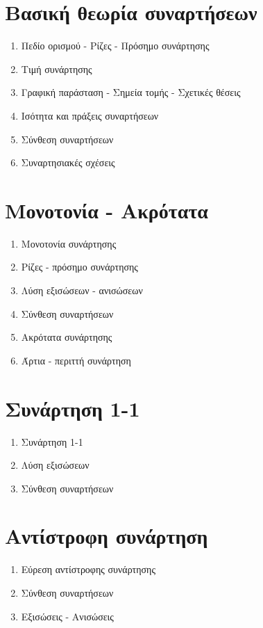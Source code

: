 \documentclass[twoside,nofonts,math,spyros,ektypwsh]{frontisthrio}
\begin{document}
\section{Βασική θεωρία συναρτήσεων}
\begin{multicols}{2}
\begin{enumerate}
\item Πεδίο ορισμού - Ρίζες - Πρόσημο συνάρτησης
\item Τιμή συνάρτησης
\item Γραφική παράσταση - Σημεία τομής - Σχετικές θέσεις
\item Ισότητα και πράξεις συναρτήσεων
\item Σύνθεση συναρτήσεων
\item Συναρτησιακές σχέσεις
\end{enumerate}
\end{multicols}
\section{Μονοτονία - Ακρότατα}
\begin{multicols}{2}
\begin{enumerate}
\item Μονοτονία συνάρτησης
\item Ρίζες - πρόσημο συνάρτησης
\item Λύση εξισώσεων - ανισώσεων
\item Σύνθεση συναρτήσεων
\item Ακρότατα συνάρτησης
\item Άρτια - περιττή συνάρτηση
\end{enumerate}
\end{multicols}
\section{Συνάρτηση 1-1}
\begin{multicols}{2}
\begin{enumerate}
\item Συνάρτηση 1-1
\item Λύση εξισώσεων
\item Σύνθεση συναρτήσεων
\end{enumerate}
\end{multicols}
\section{Αντίστροφη συνάρτηση}
\begin{multicols}{2}
\begin{enumerate}
\item Εύρεση αντίστροφης συνάρτησης
\item Σύνθεση συναρτήσεων
\item Εξισώσεις - Ανισώσεις
\end{enumerate}
\end{multicols}
\newpage
\end{document}
